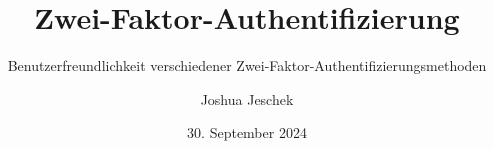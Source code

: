 \newcommand{\organization}{
    Technische Universität Chemnitz \\
    Fakultät Informatik \\
    Professur Medieninformatik \\
}
\newcommand{\type}{Hauptseminar}
\newcommand{\theauthor}{Joshua Jeschek}
\newcommand{\thetitle}{Zwei-Faktor-Authentifizierung}
\newcommand{\thesubtitle}{Benutzerfreundlichkeit verschiedener Zwei-Faktor-Authentifizierungsmethoden}
\newcommand{\pruefer}{Dr. Thomas Wilhelm-Stein}
\newcommand{\place}{Chemnitz}
\date{30. September 2024}

\author{\theauthor}
\title{\thetitle}
\subtitle{\thesubtitle}
